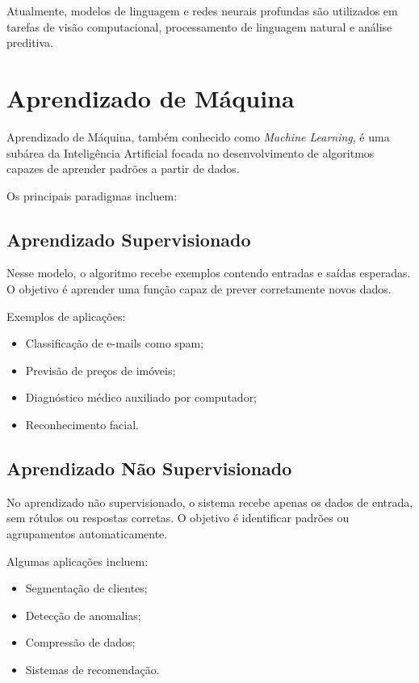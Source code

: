 \documentclass[11pt]{article}
\begin{document}
Atualmente, modelos de linguagem e redes neurais profundas são utilizados em tarefas de visão
computacional, processamento de linguagem natural e análise preditiva.
 

\section{Aprendizado de Máquina}

Aprendizado de Máquina, também conhecido como \textit{Machine Learning}, é uma subárea da
Inteligência Artificial focada no desenvolvimento de algoritmos capazes de aprender padrões a
partir de dados.

Os principais paradigmas incluem: 

\subsection{Aprendizado Supervisionado}

Nesse modelo, o algoritmo recebe exemplos contendo entradas e saídas esperadas. O objetivo é
aprender uma função capaz de prever corretamente novos dados.

Exemplos de aplicações:

\begin{itemize}
    \item Classificação de e-mails como spam;
    \item Previsão de preços de imóveis;
    \item Diagnóstico médico auxiliado por computador;
    \item Reconhecimento facial.
\end{itemize}
 

\subsection{Aprendizado Não Supervisionado}

No aprendizado não supervisionado, o sistema recebe apenas os dados de entrada, sem rótulos
ou respostas corretas. O objetivo é identificar padrões ou agrupamentos automaticamente.

Algumas aplicações incluem:

\begin{itemize}
    \item Segmentação de clientes;
    \item Detecção de anomalias;
    \item Compressão de dados;
    \item Sistemas de recomendação.
\end{itemize} 
\end{document}
